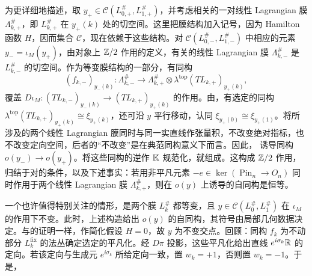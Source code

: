 为更详细地描述，取 $y_+\in\mathcal C(L_{0,+}^\#,L_{1,+}^\#)$，并考虑相关的一对线性 Lagrangian 膜 $\Lambda_{k,+}^\#$，即 $L_{k,+}^\#$ 在 $y_+(k)$ 处的切空间。这里把膜结构加入记号，因为 Hamilton 函数 $H$，因而集合 $\mathcal C$，现在依赖于这些结构。对 $\mathcal C(L_{0,-}^\#,L_{1,-}^\#)$ 中相应的元素 $y_-=\iota_M(y_+)$，由对象上 $\mathbb Z/2$ 作用的定义，有关的线性 Lagrangian 膜 $\Lambda_{k,-}^\#$ 是 $L_{k,-}^\#$ 的切空间。作为等变膜结构的一部分，有同构
\begin{equation}\label{eq:14.16}
(f_{k,-})_{y_-(k)}:\Lambda_{k,-}^\#\longrightarrow
\Lambda_{k,+}^\#\otimes\lambda^{\mathrm{top}}(TL_{k,+})_{y_+(k)},
\end{equation}
覆盖 $D\iota_M:(TL_{k,-})_{y_-(k)}\to(TL_{k,+})_{y_+(k)}$ 的作用。由，有选定的同构 $\lambda^{\mathrm{top}}(TL_{k,+})_{y_+(k)}\cong\xi_{y_+(k)}$，还可沿 $y$ 平行移动，认同 $\xi_{y_+(0)}\cong\xi_{y_+(1)}$。将所涉及的两个线性 Lagrangian 膜同时与同一实直线作张量积，不改变绝对指标，也不改变定向空间，后者的“不改变”是在典范同构意义下而言。因此，
诱导同构 $o(y_-)\to o(y_+)$。将这些同构的逆作 $\mathbb K$ 规范化，就组成。这构成 $\mathbb Z/2$ 作用，归结于对的条件，以及下述事实：若用非平凡元素 $-e\in\ker(\operatorname{Pin}_n\to O_n)$ 同时作用于两个线性 Lagrangian 膜 $\Lambda_{k,+}^\#$，则在 $o(y)$ 上诱导的自同构是恒等。

一个也许值得特别关注的情形，是两个膜 $L_k^\#$ 都等变，且 $y\in\mathcal C(L_0^\#,L_1^\#)$ 在 $\iota_M$ 的作用下不变。此时，上述构造给出 $o(y)$ 的自同构，其符号由局部几何数据决定。与的证明一样，作简化假设 $H=0$，故 $y$ 为不变交点。回顾：同构 $f_k$ 为不动部分 $L_k^{\mathrm{fix}}$ 的法丛确定选定的平凡化。经 $D\pi$ 投影，这些平凡化给出直线 $e^{i\sigma_k}\mathbb R$ 的定向。若该定向与生成元 $e^{i\sigma_k}$ 所给定向一致，置 $w_k=+1$，否则置 $w_k=-1$。于是，

